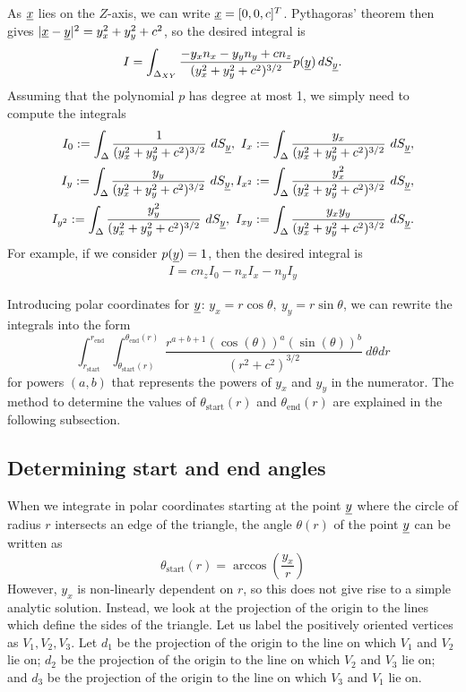 \documentclass[../paper.tex]{subfiles}
\begin{document}
As $\underline{x}$ lies on the $Z$-axis, we can write $\underline{x} = [0, 0, c]^T$. 
Pythagoras' theorem then gives $|\underline{x} - \underline{y}|^2 = y_x^2 + y_y^2 + c^2$, so the desired integral is 
\begin{equation*}
    I = \int_{\Delta_{XY}} \frac{-y_xn_x-y_yn_y+cn_z}{(y_x^2+y_y^2+c^2)^{3/2}} p(\underline{y})\, dS_{\underline{y}}.
\end{equation*}
Assuming that the polynomial $p$ has degree at most 1, we simply need to compute the integrals  
\begin{align*}
I_0:=\int_\Delta \frac{1}{(y_x^2+y_y^2+c^2)^{3/2}} ~dS_{\underline{y}},~ I_x:=\int_\Delta \frac{y_x}{(y_x^2+y_y^2+c^2)^{3/2}}~dS_{\underline{y}}, \\ 
I_y:=\int_\Delta \frac{y_y}{(y_x^2+y_y^2+c^2)^{3/2}}~dS_{\underline{y}}, I_{x^2}:=\int_\Delta \frac{y_x^2}{(y_x^2+y_y^2+c^2)^{3/2}}~dS_{\underline{y}}, \\
I_{y^2}:=\int_\Delta \frac{y_y^2}{(y_x^2+y_y^2+c^2)^{3/2}}~dS_{\underline{y}},~ I_{xy}:=\int_\Delta \frac{y_xy_y}{(y_x^2+y_y^2+c^2)^{3/2}}~dS_{\underline{y}}.
\end{align*}
For example, if we consider $p(\underline{y}) = 1$, then the desired integral is 
\begin{align*}
I =  cn_z I_0 - n_x I_x - n_y I_y
\end{align*}

Introducing polar coordinates for $\underline{y}$: $y_x=r\cos\theta,~ y_y=r\sin\theta$, we can rewrite the integrals into the form
\begin{equation*}
    \int_{r_\mathrm{start}}^{r_\mathrm{end}} \int_{\theta_\mathrm{start}(r)}^{\theta_\mathrm{end}(r)} \frac{r^{a+b+1}(\cos(\theta))^a(\sin(\theta))^b}{(r^2+c^2)^{3/2}} ~d\theta dr
\end{equation*}
for powers $(a,b)$ that represents the powers of $y_x$ and $y_y$ in the numerator.  
The method to determine the values of $\theta_\mathrm{start}(r)$ and $\theta_\mathrm{end}(r)$ are explained in the following subsection.

\subsection{Determining start and end angles}
When we integrate in polar coordinates starting at the point $\underline{y}$ where the circle of radius $r$ intersects an edge of the triangle, 
the angle $\theta(r)$ of the point $\underline{y}$ can be written as 
\begin{equation}
    \theta_\mathrm{start}(r) = \arccos\left(\frac{y_x}{r}\right)
\end{equation}
However, $y_x$ is non-linearly dependent on $r$, so this does not give rise to a simple analytic solution. 
Instead, we look at the projection of the origin to the lines which define the sides of the triangle. 
Let us label the positively oriented vertices as $V_1, V_2, V_3$. 
Let $d_1$ be the projection of the origin to the line on which $V_1$ and $V_2$ lie on; $d_2$ be the projection of the origin to the line on which $V_2$ and $V_3$ lie on; 
and $d_3$ be the projection of the origin to the line on which $V_3$ and $V_1$ lie on.
\end{document}
